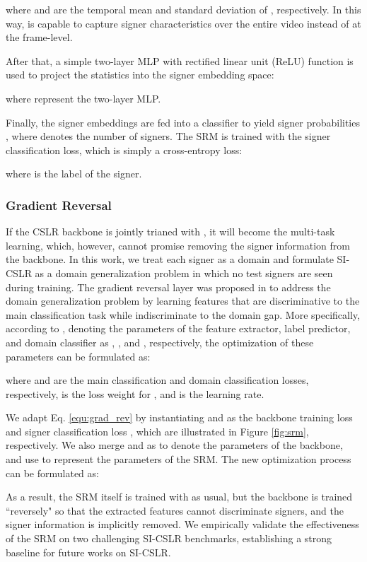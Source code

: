 \documentclass[acmsmall,screen]{acmart}
\begin{document}
where  and  are the temporal mean and standard deviation of , respectively. 
In this way,  is capable to capture signer characteristics over the entire video instead of at the frame-level.

After that, a simple two-layer MLP with rectified linear unit (ReLU) function is used to project the statistics into the signer embedding space:

where  represent the two-layer MLP.

Finally, the signer embeddings  are fed into a classifier to yield signer probabilities , where  denotes the number of signers. 
The SRM is trained with the signer classification loss, which is simply a cross-entropy loss:

where  is the label of the signer.

\subsubsection{Gradient Reversal}
If the CSLR backbone is jointly trianed with , it will become the multi-task learning, which, however, cannot promise removing the signer information from the backbone.
In this work, we treat each signer as a domain and formulate SI-CSLR as a domain generalization problem in which no test signers are seen during training. 
The gradient reversal layer was proposed in \cite{ganin2016domain} to address the domain generalization problem by learning features that are discriminative to the main classification task while indiscriminate to the domain gap.
More specifically, according to \cite{ganin2016domain}, denoting the parameters of the feature extractor, label predictor, and domain classifier as , , and , respectively, the optimization of these parameters can be formulated as:

where  and  are the main classification and domain classification losses, respectively,  is the loss weight for , and  is the learning rate.



We adapt Eq. \ref{equ:grad_rev} by instantiating  and  as the backbone training loss  and signer classification loss , which are illustrated in Figure 
\ref{fig:srm}, respectively. We also merge  and  as  to denote the parameters of the backbone, and use  to represent the parameters of the SRM. The new optimization process can be formulated as:


As a result, the SRM itself is trained with  as usual, but the backbone is trained ``reversely" so that the extracted features cannot discriminate signers, and the signer information is implicitly removed.
We empirically validate the effectiveness of the SRM on two challenging SI-CSLR benchmarks, establishing a strong baseline for future works on SI-CSLR.
\end{document}
